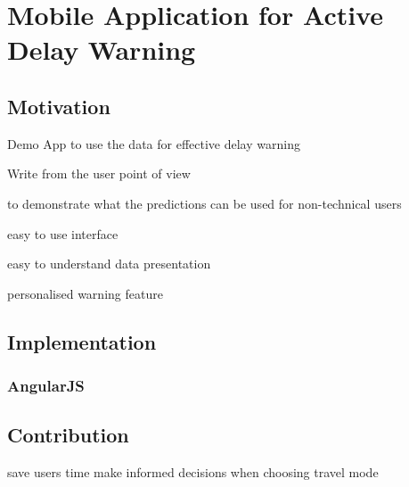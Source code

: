 \chapter{Mobile Application for Active Delay Warning}
\label{ch:mobile_app}
\section{Motivation}
\par Demo App to use the data for effective delay warning

\par Write from the user point of view

\par to demonstrate what the predictions can be used for non-technical users

\par easy to use interface
\par easy to understand data presentation

\par personalised warning feature

\section{Implementation}
\subsection{AngularJS}

\section{Contribution}
save users time
make informed decisions when choosing travel mode
